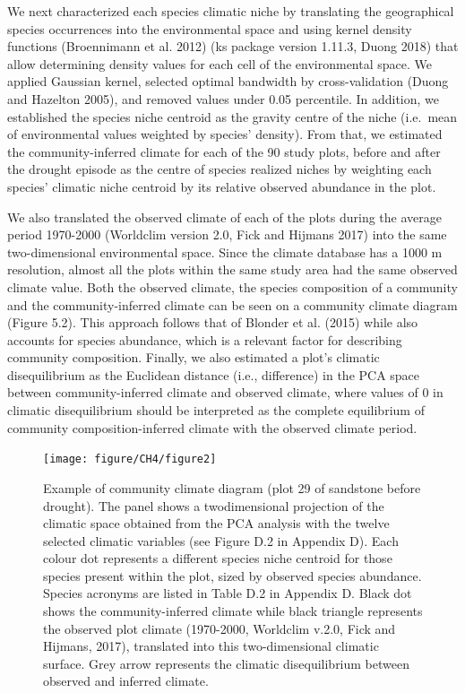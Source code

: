 \documentclass[11pt,twoside]{reedthesis}
\begin{document}
We next characterized each species climatic niche by translating the
geographical species occurrences into the environmental space and using
kernel density functions (Broennimann et al. 2012) (ks package version
1.11.3, Duong 2018) that allow determining density values for each cell
of the environmental space. We applied Gaussian kernel, selected optimal
bandwidth by cross-validation (Duong and Hazelton 2005), and removed
values under 0.05 percentile. In addition, we established the species
niche centroid as the gravity centre of the niche (i.e.~mean of
environmental values weighted by species' density). From that, we
estimated the community-inferred climate for each of the 90 study plots,
before and after the drought episode as the centre of species realized
niches by weighting each species' climatic niche centroid by its
relative observed abundance in the plot.\par

We also translated the observed climate of each of the plots during the
average period 1970-2000 (Worldclim version 2.0, Fick and Hijmans 2017)
into the same two-dimensional environmental space. Since the climate
database has a 1000 m resolution, almost all the plots within the same
study area had the same observed climate value. Both the observed
climate, the species composition of a community and the
community-inferred climate can be seen on a community climate diagram
(Figure 5.2). This approach follows that of Blonder et al. (2015) while
also accounts for species abundance, which is a relevant factor for
describing community composition. Finally, we also estimated a plot's
climatic disequilibrium as the Euclidean distance (i.e., difference) in
the PCA space between community-inferred climate and observed climate,
where values of 0 in climatic disequilibrium should be interpreted as
the complete equilibrium of community composition-inferred climate with
the observed climate period.\par

\setlength{\abovecaptionskip}{10pt}
\begin{figure}[hbt!]

{\centering \texttt{[image: figure/CH4/figure2]} 

}

\caption[Example of community climate diagram]{Example of community climate diagram (plot 29 of sandstone before drought). The panel shows a twodimensional projection of the climatic space obtained from the PCA analysis with the twelve selected climatic variables (see Figure D.2 in Appendix D). Each colour dot represents a different species niche centroid for those species present within the plot, sized by observed species abundance. Species acronyms are listed in Table D.2 in Appendix D. Black dot shows the community-inferred climate while black triangle represents the observed plot climate (1970-2000, Worldclim v.2.0, Fick and Hijmans, 2017), translated into this two-dimensional climatic surface. Grey arrow represents the climatic disequilibrium between observed and inferred climate.}\label{fig:Ch4plot2}
\end{figure}
\end{document}
